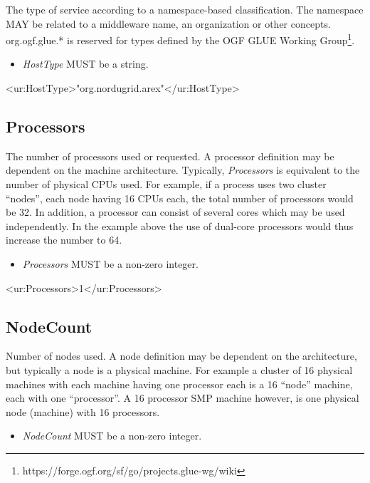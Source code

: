 The type of service according to a namespace-based classification. The namespace MAY be related to a middleware name, an organization or other concepts. org.ogf.glue.* is reserved for types defined by the OGF GLUE Working Group\footnote{https://forge.ogf.org/sf/go/projects.glue-wg/wiki}.
\begin{itemize}
\item \emph{HostType} MUST be a string.
\end{itemize}

\begin{XMLexample}
<ur:HostType>"org.nordugrid.arex"</ur:HostType>
\end{XMLexample}






\subsection{Processors}

The number of processors used or requested. A processor definition may be dependent on
the machine architecture. Typically, \emph{Processors} is equivalent to the number of physical
CPUs used. For example, if a process uses two cluster ``nodes'', each node having 16 CPUs
each, the total number of processors would be 32.
In addition, a processor can consist of several cores which may be used independently. In the example above the use of dual-core processors would thus increase the number to 64.
\begin{itemize}
\item \emph{Processors} MUST be a non-zero integer.
\end{itemize}

\begin{XMLexample}
<ur:Processors>1</ur:Processors>
\end{XMLexample}






\subsection{NodeCount}

Number of nodes used. A node definition may be dependent on the architecture, but typically a node is a physical machine. For example a cluster of 16 physical machines with each machine having one processor each is a 16 ``node'' machine, each with one ``processor''. A 16 processor SMP machine however, is one physical node (machine) with 16 processors.
\begin{itemize}
\item \emph{NodeCount} MUST be a non-zero integer.
\end{itemize}

